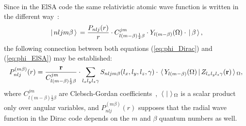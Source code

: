 \documentclass[12pt,openright,twoside,headsepline,bibtotoc]{scrbook}
\begin{document}
Since in the ElSA code the same relativistic atomic wave function is written in the different way~\cite{ElSA:site}:
\begin{equation}
\,| \, n l j m \beta \, \rangle\, = \frac{P_{n l j}(r)}{r} \cdot C^{j m}_{l (m-\beta) \frac{1}{2} \beta} \cdot Y_{l (m-\beta)}(\Omega) \cdot \,| \, \beta \, \rangle\, ,
\label{eq:phi_ElSA}
\end{equation}
%
the following connection between both equations (\ref{eq:phi_Dirac}) and (\ref{eq:phi_ElSA}) may be established:
\begin{equation}
P_{n l j}^{(m \beta)}(r) = \frac{\mathbf{r}}{C^{j m}_{l (m-\beta) \frac{1}{2} \beta}} \cdot \sum_{l_x l_y l_z \gamma} S_{n l j m \beta}(l_x, l_y, l_z, \gamma) \cdot \,\langle \, Y_{l (m-\beta)}(\Omega) \, | \, Z_{l_x l_y l_z \gamma}(\mathbf{r}) \, \rangle\,_\Omega ,
\label{eq:Pmbeta}
\end{equation}
%
where $C^{j m}_{l (m-\beta) \frac{1}{2} \beta}$ are Clebsch-Gordan coefficients~\cite{Varshalovich:75}, $\,\langle \,  \, | \,  \, \rangle\,_\Omega$ is a scalar product only over angular variables, and $P_{n l j}^{(m \beta)}(r)$ supposes that the radial wave function in the Dirac code depends on the $m$ and $\beta$ quantum numbers as well. 
\end{document}
